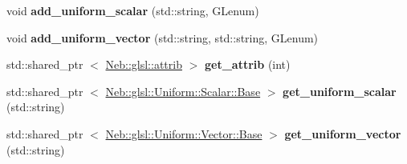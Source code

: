 \begin{DoxyCompactItemize}
\item 
\hypertarget{classNeb_1_1glsl_1_1program_a73343348c02d88760f98af88e0a84f45}{void {\bfseries add\-\_\-uniform\-\_\-scalar} (std\-::string, \-G\-Lenum)}\label{classNeb_1_1glsl_1_1program_a73343348c02d88760f98af88e0a84f45}

\item 
\hypertarget{classNeb_1_1glsl_1_1program_a35275f3f95ea83f2023364f585626845}{void {\bfseries add\-\_\-uniform\-\_\-vector} (std\-::string, std\-::string, \-G\-Lenum)}\label{classNeb_1_1glsl_1_1program_a35275f3f95ea83f2023364f585626845}

\item 
\hypertarget{classNeb_1_1glsl_1_1program_ab77d4536050a8ee71796b3e12fd73ef8}{std\-::shared\-\_\-ptr\*
$<$ \hyperlink{classNeb_1_1glsl_1_1attrib}{\-Neb\-::glsl\-::attrib} $>$ {\bfseries get\-\_\-attrib} (int)}\label{classNeb_1_1glsl_1_1program_ab77d4536050a8ee71796b3e12fd73ef8}

\item 
\hypertarget{classNeb_1_1glsl_1_1program_a1ad4caea22dd6d3bdd788cf40ac32fd2}{std\-::shared\-\_\-ptr\*
$<$ \hyperlink{classNeb_1_1glsl_1_1Uniform_1_1Scalar_1_1Base}{\-Neb\-::glsl\-::\-Uniform\-::\-Scalar\-::\-Base} $>$ {\bfseries get\-\_\-uniform\-\_\-scalar} (std\-::string)}\label{classNeb_1_1glsl_1_1program_a1ad4caea22dd6d3bdd788cf40ac32fd2}

\item 
\hypertarget{classNeb_1_1glsl_1_1program_aa5920f8b94fb3503b6ce9c883a29fcdf}{std\-::shared\-\_\-ptr\*
$<$ \hyperlink{classNeb_1_1glsl_1_1Uniform_1_1Vector_1_1Base}{\-Neb\-::glsl\-::\-Uniform\-::\-Vector\-::\-Base} $>$ {\bfseries get\-\_\-uniform\-\_\-vector} (std\-::string)}\label{classNeb_1_1glsl_1_1program_aa5920f8b94fb3503b6ce9c883a29fcdf}

\end{DoxyCompactItemize}
